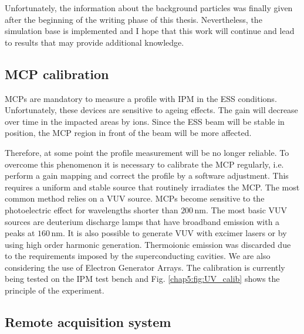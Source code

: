 Unfortunately, the information about the background particles was finally given after the beginning of the writing phase of this thesis. Nevertheless, the simulation base is implemented and I hope that this work will continue and lead to results that may provide additional knowledge.


\subsection*{MCP calibration}


MCPs are mandatory to measure a profile with IPM in the ESS conditions. Unfortunately, these devices are sensitive to ageing effects. The gain will decrease over  time in the impacted areas by ions. Since the ESS beam will be stable in position, the MCP region in front of the beam will be more affected.

Therefore, at some point the profile measurement will be no longer reliable. To overcome this phenomenon it is necessary to calibrate the MCP regularly, i.e. perform a gain mapping and correct the profile by a software adjustment. This requires a uniform and stable source that routinely irradiates the MCP. The most common method relies on a VUV source. MCPs become sensitive to the photoelectric effect for wavelengths shorter than $200\,\mathrm{nm}$. The most basic VUV sources are deuterium discharge lamps that have broadband emission with a peaks at $160\,\mathrm{nm}$. It is also possible to generate VUV with excimer lasers or by using high order harmonic generation. Thermoionic emission was discarded due to the requirements imposed by the superconducting cavities. We are also considering the use of Electron Generator Arrays. The calibration is currently being tested on the IPM test bench and Fig. \ref{chap5:fig:UV_calib} shows the principle of the experiment.

\subsection*{Remote acquisition system}

